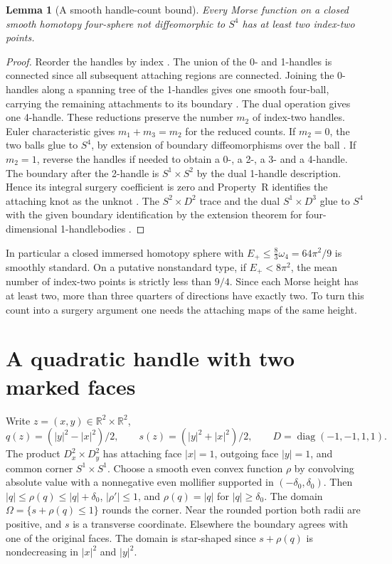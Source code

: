 \documentclass[11pt,letterpaper]{article}
\numberwithin{equation}{section}
\newtheorem{lemma}[theorem]{Lemma}
\theoremstyle{definition}
\begin{document}
\begin{lemma}[A smooth handle-count bound]\label{lem:top}
Every Morse function on a closed smooth homotopy four-sphere
not diffeomorphic to \(S^4\) has at least two index-two points.
\end{lemma}

\begin{proof}
Reorder the handles by index
\cite[Theorems 4.7--4.8]{Milnor1965HCobordism}.
The union of the 0- and 1-handles
is connected since all subsequent attaching regions are connected.
Joining the 0-handles along a spanning tree of the 1-handles
gives one smooth four-ball, carrying the remaining attachments to
its boundary \cite[Theorem~5.4]{Milnor1965HCobordism}.
The dual operation gives one 4-handle. These reductions
preserve the number \(m_2\) of index-two handles. Euler
characteristic gives \(m_1+m_3=m_2\) for the reduced counts.
If \(m_2=0\), the two balls glue to \(S^4\), by extension of
boundary diffeomorphisms over the ball \cite{Hatcher1983Smale}.
If \(m_2=1\), reverse the handles if needed to obtain a 0-, a
2-, a 3- and a 4-handle. The boundary after the 2-handle is
\(S^1\times S^2\) by the dual 1-handle description. Hence its
integral surgery coefficient is zero and Property~R identifies the
attaching knot as the unknot \cite[Corollary 8.6]{Gabai1987FoliationsIII}.
The \(S^2\times D^2\) trace and the dual \(S^1\times D^3\)
glue to \(S^4\) with the given boundary identification by the
extension theorem for four-dimensional 1-handlebodies
\cite[Theorem A]{LaudenbachPoenaru1972Handlebodies}.
\end{proof}

In particular a closed immersed homotopy sphere with
\(E_+\le\frac83\omega_4=64\pi^2/9\) is smoothly standard.
On a putative nonstandard type, if \(E_+<8\pi^2\), the mean number
of index-two points is strictly less than \(9/4\). Since each
Morse height has at least two, more than three quarters of directions
have exactly two. To turn this count into a surgery argument one
needs the attaching maps of the same height.

\section{A quadratic handle with two marked faces}
\label{sec:graph}

Write \(z=(x,y)\in\mathbb R^2\times\mathbb R^2\),
\[
 q(z)=(|y|^2-|x|^2)/2,\qquad s(z)=(|y|^2+|x|^2)/2,\qquad
 D=\operatorname{diag}(-1,-1,1,1).
\]
The product \(D^2_x\times D^2_y\) has attaching face \(|x|=1\),
outgoing face \(|y|=1\), and common corner \(S^1\times S^1\).
Choose a smooth even convex function \(\rho\) by convolving absolute
value with a nonnegative even mollifier supported in
\((-\delta_0,\delta_0)\). Then \(|q|\le\rho(q)\le |q|+\delta_0\),
\(|\rho'|\le1\), and \(\rho(q)=|q|\) for \(|q|\ge\delta_0\).
The domain \(\Omega=\{s+\rho(q)\le1\}\) rounds the corner.
Near the rounded portion both radii are positive, and \(s\) is
a transverse coordinate. Elsewhere the boundary agrees with
one of the original faces. The domain is star-shaped since
\(s+\rho(q)\) is nondecreasing in \(|x|^2\) and \(|y|^2\).
\end{document}
